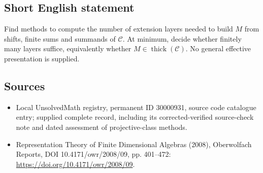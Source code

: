 \documentclass[11pt]{article}
\begin{document}
\subsection{Short English statement}
Find methods to compute the number of extension layers needed to build $M$ from shifts, finite sums and summands of $\mathcal C$. At minimum, decide whether finitely many layers suffice, equivalently whether $M\in\operatorname{thick}(\mathcal C)$. No general effective presentation is supplied.
\subsection{Sources}
\begin{itemize}
\item Local UnsolvedMath registry, permanent ID 30000931, source code catalogue entry; supplied complete record, including its corrected-verified source-check note and dated assessment of projective-class methods.
\item Representation Theory of Finite Dimensional Algebras (2008), Oberwolfach Reports, DOI 10.4171/owr/2008/09, pp. 401--472: \url{https://doi.org/10.4171/owr/2008/09}.
\end{itemize}
\end{document}

